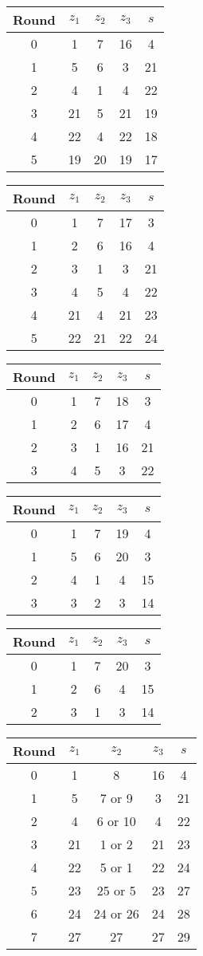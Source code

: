 \begin{multicols}{2}
\begin{tabular}{c | c | c | c | c }
Round & $z_1$ & $z_2$ & $z_3$ & $s$ \\
\hline
0 & 1 & 7 & 16 & 4 \\
1 & 5 & 6 & 3 & 21 \\
2 & 4 & 1 & 4 & 22 \\
3 & 21 & 5 & 21 & 19 \\
4 & 22 & 4 & 22 & 18 \\
5 & 19 & 20 & 19 & 17
\end{tabular}


\begin{tabular}{c | c | c | c | c }
Round & $z_1$ & $z_2$ & $z_3$ & $s$ \\
\hline
0 & 1 & 7 & 17 & 3 \\
1 & 2 & 6 & 16 & 4 \\
2 & 3 & 1 & 3 & 21 \\
3 & 4 & 5 & 4 & 22 \\
4 & 21 & 4 & 21 & 23 \\
5 & 22 & 21 & 22 & 24
\end{tabular}


\begin{tabular}{c | c | c | c | c }
Round & $z_1$ & $z_2$ & $z_3$ & $s$ \\
\hline
0 & 1 & 7 & 18 & 3 \\
1 & 2 & 6 & 17 & 4 \\
2 & 3 & 1 & 16 & 21 \\
3 & 4 & 5 & 3 & 22
\end{tabular}


\begin{tabular}{c | c | c | c | c }
Round & $z_1$ & $z_2$ & $z_3$ & $s$ \\
\hline
0 & 1 & 7 & 19 & 4 \\
1 & 5 & 6 & 20 & 3 \\
2 & 4 & 1 & 4 & 15 \\
3 & 3 & 2 & 3 & 14
\end{tabular}


\begin{tabular}{c | c | c | c | c }
Round & $z_1$ & $z_2$ & $z_3$ & $s$ \\
\hline
0 & 1 & 7 & 20 & 3 \\
1 & 2 & 6 & 4 & 15 \\
2 & 3 & 1 & 3 & 14
\end{tabular}


\begin{tabular}{c | c | c | c | c }
Round & $z_1$ & $z_2$ & $z_3$ & $s$ \\
\hline
0 & 1 & 8 & 16 & 4 \\
1 & 5 & 7 or 9 & 3 & 21 \\
2 & 4 & 6 or 10 & 4 &  22 \\
3 & 21 & 1 or 2 & 21 & 23 \\
4 & 22 & 5 or 1 & 22 & 24 \\
5 & 23 & 25 or 5 & 23 & 27 \\
6 & 24 & 24 or 26 & 24 & 28 \\
7 & 27 & 27 & 27 & 29
\end{tabular}



\end{multicols}
